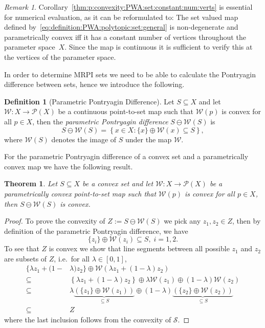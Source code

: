 \documentclass[journal]{IEEEtran}
\newcounter{thmcount}
\newtheorem{thm}[thmcount]{Theorem}
\theoremstyle{remark}
\newtheorem{rem}[thmcount]{Remark}
\theoremstyle{definition}
\newtheorem{defi}[thmcount]{Definition}
\begin{document}
%
\begin{rem}
Corollary~\ref{thm:p:convexity:PWA:set:constant:num:verts} is essential for numerical evaluation, as it can be reformulated to:
%
The set valued map defined by~\eqref{eq:definition:PWA:polytopic:set:general} is non-degenerate and parametrically convex iff 
it has a constant number of vertices throughout the parameter space~$X$.
%
Since the map is continuous it is sufficient to verify this at the vertices of the parameter space.
%
\end{rem}
%
In order to determine MRPI sets we need to be able to calculate the Pontryagin difference between sets, hence we introduce
the following.
%
\begin{defi}[Parametric Pontryagin Difference]\label{def:parametric:pontryagin:difference}
  Let $S\subseteq X$ and let $\mathcal W:X\to\mathscr P(X)$ be a continuous point-to-set map such that
  $\mathcal W(p)$ is convex for all $p\in X$, then the \emph{parametric Pontryagin difference} 
  $S\ominus \mathcal W(S)$ is 
%
  \begin{equation}\label{eq:definition:parametric:pontryagin:difference}
    S\ominus \mathcal W(S) = \left\{x\in X: \{x\} \oplus \mathcal W(x)\subseteq S\right\},
  \end{equation}
%
  where $\mathcal W(S)$ denotes the image of $S$ under the map $\mathcal W$. 
\end{defi}
%
For the parametric Pontryagin difference of a convex set and a parametrically convex map we 
have the following result.
%
\begin{thm}\label{thm:convexity:of:pontryagin:difference}
  Let $S\subseteq X$ be a convex set and let $\mathcal W:X\rightarrow\mathscr P(X)$ be a parametrically convex point-to-set
  map such that $\mathcal W(p)$ is convex for all $p\in X$, then $S\ominus \mathcal W(S)$ is convex.
\end{thm}
%
\begin{proof}
To prove the convexity of $ Z :=  S\ominus \mathcal W( S)$ we pick any $z_1,z_2\in Z$, then
by definition of the parametric Pontryagin difference, we have
%
\begin{equation}
  \{z_i\} \oplus \mathcal W(z_i) \subseteq S,\; i=1,2.
\end{equation}
%
To see that $ Z$ is convex we show that line segments between
all possible $z_1$ and $z_2$ are subsets of $ Z$, i.e.~for all $\lambda \in [0,1]$,
\begin{equation}
\begin{aligned}
  \{ \lambda z_1 + (1-&\lambda)z_2
  \}\oplus \mathcal W\left( \lambda z_1 + (1-\lambda)z_2\right)\\
  \subseteq&\left\{ \lambda z_1 + (1-\lambda)z_2
  \right\}\oplus \lambda \mathcal W(z_1) \oplus (1-\lambda)
  \mathcal W(z_2)\\
  \subseteq &\lambda\underbrace{(\{z_1\}\oplus \mathcal W(z_1))}_{\subseteq S}\oplus
  (1-\lambda)\underbrace{(\{z_2\}\oplus \mathcal W(z_2))}_{\subseteq S}\\
  \subseteq& Z
\end{aligned}
\end{equation}
%
where the last inclusion follows from the convexity of $\mathcal S$.
\end{proof}
\end{document}
